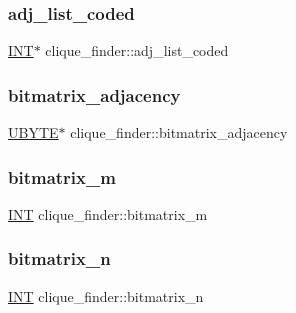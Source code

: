 \subsubsection{\texorpdfstring{adj\+\_\+list\+\_\+coded}{adj\_list\_coded}}
{\footnotesize\ttfamily \mbox{\hyperlink{galois_8h_a09fddde158a3a20bd2dcadb609de11dc}{I\+NT}}$\ast$ clique\+\_\+finder\+::adj\+\_\+list\+\_\+coded}

\mbox{\label{classclique__finder_a4ac321346e2b4530926cda6f28cde926}} 
\subsubsection{\texorpdfstring{bitmatrix\+\_\+adjacency}{bitmatrix\_adjacency}}
{\footnotesize\ttfamily \mbox{\hyperlink{galois_8h_a122c4acf389c050379f00341fdcd5812}{U\+B\+Y\+TE}}$\ast$ clique\+\_\+finder\+::bitmatrix\+\_\+adjacency}

\mbox{\label{classclique__finder_a953a721978f7f79e21f110ba0d9cd578}} 
\subsubsection{\texorpdfstring{bitmatrix\+\_\+m}{bitmatrix\_m}}
{\footnotesize\ttfamily \mbox{\hyperlink{galois_8h_a09fddde158a3a20bd2dcadb609de11dc}{I\+NT}} clique\+\_\+finder\+::bitmatrix\+\_\+m}

\mbox{\label{classclique__finder_a4d2852832d86dacdfe6eff86ef948dc8}} 
\subsubsection{\texorpdfstring{bitmatrix\+\_\+n}{bitmatrix\_n}}
{\footnotesize\ttfamily \mbox{\hyperlink{galois_8h_a09fddde158a3a20bd2dcadb609de11dc}{I\+NT}} clique\+\_\+finder\+::bitmatrix\+\_\+n}

